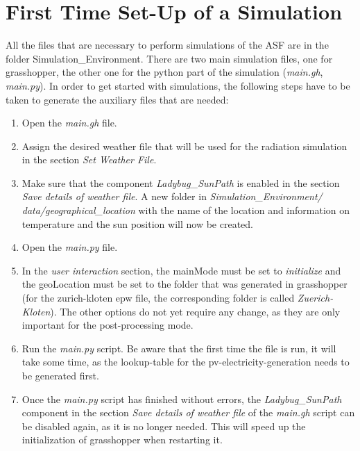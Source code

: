 \section{First Time Set-Up of a Simulation}
\label{s:setUp}

	All the files that are necessary to perform simulations of the ASF are in the folder Simulation\_Environment. There are two main simulation files, one for grasshopper, the other one for the python part of the simulation (\emph{main.gh}, \emph{main.py}). In order to get started with simulations, the following steps have to be taken to generate the auxiliary files that are needed:

	\begin{enumerate}
	\item Open the \emph{main.gh} file.  

	\item Assign the desired weather file that will be used for the radiation simulation in the section \emph{Set Weather File}. 

	\item Make sure that the component \emph{Ladybug\_SunPath} is enabled in the section \emph{Save details of weather file}. A new folder in {\it Simulation\_Environment/ data/geographical\_location} with the name of the location and information on temperature and the sun position will now be created. 

	\item Open the \emph{main.py} file.

	\item In the \emph{user interaction} section, the mainMode must be set to \emph{initialize} and the geoLocation must be set to the folder that was generated in grasshopper (for the zurich-kloten epw file, the corresponding folder is called \emph{Zuerich-Kloten}). The other options do not yet require any change, as they are only important for the post-processing mode.

	\item Run the \emph{main.py} script. Be aware that the first time the file is run, it will take some time, as the lookup-table for the pv-electricity-generation needs to be generated first.

	\item Once the \emph{main.py} script has finished without errors, the \emph{Ladybug\_SunPath} component in the section \emph{Save details of weather file} of the \emph{main.gh} script can be disabled again, as it is no longer needed. This will speed up the initialization of grasshopper when restarting it. 

	\end{enumerate}

